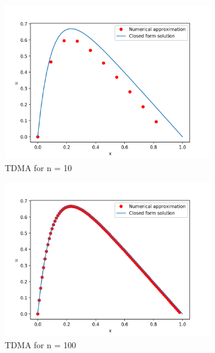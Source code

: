 \documentclass[a4paper, english]{amsart} %
\begin{document}
\begin{figure}[H]
	\centering
	\begin{subfigure}[b]{0.3\linewidth}
		\includegraphics[width=\linewidth]{Figur/TDMA_10.png}
		\caption{TDMA for n = 10}
		\label{Fig_TDMA10}
	\end{subfigure}
	\begin{subfigure}[b]{0.3\linewidth}
		\includegraphics[width=\linewidth]{Figur/TDMA_100.png}
		\caption{TDMA for n = 100}
		\label{Fig_TDMA100}
	\end{subfigure}
	\begin{subfigure}[b]{0.3\linewidth}

\end{subfigure}
\end{figure}
\end{document}

